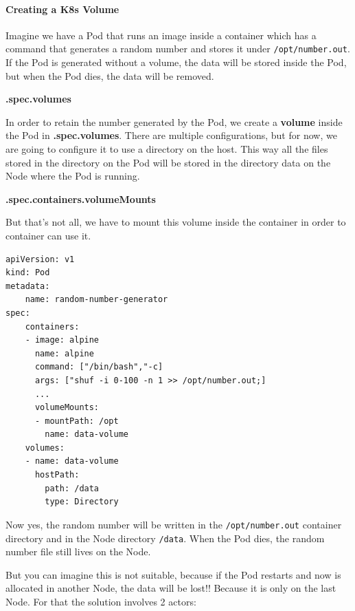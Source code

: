 \documentclass{article}
\newenvironment{codetemplate}[1][]{%
  \mybasecolorbox[#1]
  \itshape
}{%
  \endmybasecolorbox
}
\begin{document}
\paragraph{Creating a K8s Volume}

Imagine we have a Pod that runs an image inside a container which has a command that generates a random number and stores it under \verb|/opt/number.out|. If the Pod is generated without a volume, the data will be stored inside the Pod, but when the Pod dies, the data will be removed.

\textbf{.spec.volumes}

In order to retain the number generated by the Pod, we create a \textbf{volume} inside the Pod in  \textbf{.spec.volumes}. There are multiple configurations, but for now, we are going to configure it to use a directory on the host. This way all the files stored in the directory on the Pod will be stored in the directory data on the Node where the Pod is running.

\textbf{.spec.containers.volumeMounts}

But that's not all,  we have to mount this volume inside the container in order to container can use it.

\begin{codetemplate}{}
\begin{verbatim}
apiVersion: v1
kind: Pod
metadata:
    name: random-number-generator
spec:
    containers:
    - image: alpine
      name: alpine
      command: ["/bin/bash","-c]
      args: ["shuf -i 0-100 -n 1 >> /opt/number.out;]
      ...
      volumeMounts:
      - mountPath: /opt
        name: data-volume
    volumes:
    - name: data-volume
      hostPath:
        path: /data
        type: Directory
\end{verbatim}
\end{codetemplate}

Now yes, the random number will be written in the \verb|/opt/number.out| container directory and in the Node directory \verb|/data|. When the Pod dies, the random number file still lives on the Node.

But you can imagine this is not suitable, because if the Pod restarts and now is allocated in another Node, the data will be lost!! Because it is only on the last Node. For that the solution involves 2 actors:
\end{document}

